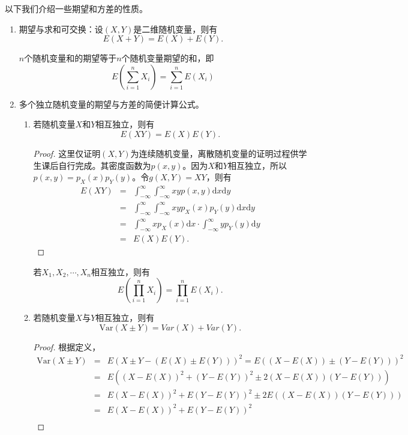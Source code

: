 以下我们介绍一些期望和方差的性质。
\begin{property}
\begin{enumerate}
    \item 期望与求和可交换：设$(X,Y)$是二维随机变量，则有
    $$E(X+Y) = E(X) + E(Y).$$
    \begin{remark} $n$个随机变量和的期望等于$n$个随机变量期望的和，即
     $$ E\left(\sum_{i=1}^{n} X_i\right) = \sum_{i=1}^{n} E(X_i)
    $$
    \end{remark}
    \item 多个独立随机变量的期望与方差的简便计算公式。
    \begin{enumerate}
        \item 若随机变量$X$和$Y$相互独立，则有
        $$E(XY) = E(X)E(Y).$$
    \begin{proof}
    这里仅证明$(X,Y)$为连续随机变量，离散随机变量的证明过程供学生课后自行完成。其密度函数为$p(x,y)$。因为$X$和$Y$相互独立，所以$p(x,y) = p_X(x)p_Y(y)$。令$g(X,Y) = XY$，则有
     \begin{eqnarray*}
         E(XY) &=& \int_{-\infty}^{\infty} \int_{-\infty}^{\infty} xy p(x,y) \text{d}x \text{d}y\\
         &=& \int_{-\infty}^{\infty}  \int_{-\infty}^{\infty} xy p_X(x) p_Y(y) \text{d}x \text{d}y\\
         &=& \int_{-\infty}^{\infty} x p_X(x)\text{d}x  \cdot\int_{-\infty}^{\infty} y  p_Y(y) \text{d}y\\
         &=& E(X) E(Y).
     \end{eqnarray*}
    \end{proof}
        \begin{remark}
            若$X_1,X_2,\cdots,X_n$相互独立，则有
            $$
            E\left(\prod_{i=1}^n X_i\right) = \prod_{i=1}^n E(X_i).
            $$
        \end{remark}
    \item 若随机变量$X$与$Y$相互独立，则有
    $$
    \text{Var}(X\pm Y) = Var(X) + Var(Y).
    $$
    \begin{proof}
    根据定义， 
        \begin{eqnarray*}
       \text{Var} (X\pm Y) &=& E(X\pm Y - (E(X) \pm E(Y)))^2 = E((X - E(X))\pm (Y-E(Y)))^2\\
        &=& E((X - E(X))^2 + (Y-E(Y))^2 \pm 2(X - E(X))(Y-E(Y)))\\
        &=& E(X - E(X))^2 + E(Y-E(Y))^2 \pm 2E((X - E(X))(Y-E(Y)))\\
        &=& E(X - E(X))^2 + E(Y-E(Y))^2\\

\end{eqnarray*}
\end{proof}
\end{enumerate}
\end{enumerate}
\end{property}
